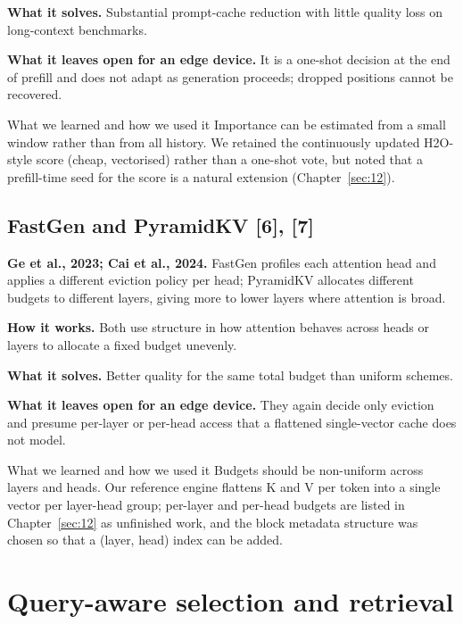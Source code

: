 \documentclass[12pt,a4paper]{report}
\begin{document}
\textbf{What it solves.} Substantial prompt-cache reduction with little quality loss on long-context benchmarks.

\textbf{What it leaves open for an edge device.} It is a one-shot decision at the end of prefill and does not adapt as generation proceeds; dropped positions cannot be recovered.

\begin{calloutbox}{What we learned and how we used it}
Importance can be estimated from a small window rather than from all history. We retained the continuously updated H2O-style score (cheap, vectorised) rather than a one-shot vote, but noted that a prefill-time seed for the score is a natural extension (Chapter~\ref{sec:12}).

\end{calloutbox}
\subsection{FastGen and PyramidKV [6], [7]}
\textbf{Ge et al., 2023; Cai et al., 2024.} FastGen profiles each attention head and applies a different eviction policy per head; PyramidKV allocates different budgets to different layers, giving more to lower layers where attention is broad.

\textbf{How it works.} Both use structure in how attention behaves across heads or layers to allocate a fixed budget unevenly.

\textbf{What it solves.} Better quality for the same total budget than uniform schemes.

\textbf{What it leaves open for an edge device.} They again decide only eviction and presume per-layer or per-head access that a flattened single-vector cache does not model.

\begin{calloutbox}{What we learned and how we used it}
Budgets should be non-uniform across layers and heads. Our reference engine flattens K and V per token into a single vector per layer-head group; per-layer and per-head budgets are listed in Chapter~\ref{sec:12} as unfinished work, and the block metadata structure was chosen so that a (layer, head) index can be added.

\end{calloutbox}
\section{Query-aware selection and retrieval}\label{sec:2_5}
\end{document}
